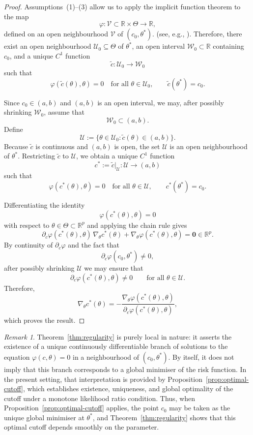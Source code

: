\documentclass[11pt,a4paper]{article}
\theoremstyle{definition}
\theoremstyle{remark}
\newtheorem{remark}[theorem]{Remark}
\newcommand{\1}{\mathbf{1}}
\begin{document}
\begin{proof}
Assumptions~(1)--(3) allow us to apply the implicit function theorem
to the map
\[
\varphi:\mathcal V\subset \mathbb R\times\Theta\to\mathbb R,
\]
defined on an open neighbourhood $\mathcal V$ of $(c_0,\theta^*)$.
(see, e.g., \citealt[Theorem~9.28]{rudin1976principles}).
Therefore, there exist an open neighbourhood
$\mathcal U_0\subseteq\Theta$ of $\theta^*$, an open interval
$\mathcal W_0\subset \mathbb R$ containing $c_0$, and a unique
$C^1$ function
\[
\tilde c:\mathcal U_0\to\mathcal W_0
\]
such that
\[
\varphi(\tilde c(\theta),\theta)=0
\quad\text{for all }\theta\in\mathcal U_0,
\qquad
\tilde c(\theta^*)=c_0.
\]

\noindent
Since $c_0\in(a,b)$ and $(a,b)$ is an open interval, we may,
after possibly shrinking $\mathcal W_0$, assume that
\[
\mathcal W_0\subset(a,b).
\]
Define
\[
\mathcal U
:=
\{\theta\in\mathcal U_0:\tilde c(\theta)\in(a,b)\}.
\]
Because $\tilde c$ is continuous and $(a,b)$ is open, the set
$\mathcal U$ is an open neighbourhood of $\theta^*$.
Restricting $\tilde c$ to $\mathcal U$, we obtain a unique
$C^1$ function
\[
c^*:=\tilde c|_{\mathcal U}:\mathcal U\to(a,b)
\]
such that
\[
\varphi(c^*(\theta),\theta)=0
\quad\text{for all }\theta\in\mathcal U,
\qquad
c^*(\theta^*)=c_0.
\]

\noindent
Differentiating the identity
\[
\varphi(c^*(\theta),\theta)=0
\]
with respect to $\theta\in\Theta\subset\mathbb R^p$ and applying the
chain rule gives
\[
\partial_c\varphi(c^*(\theta),\theta)\,
\nabla_\theta c^*(\theta)
+
\nabla_\theta\varphi(c^*(\theta),\theta)
=
\mathbf 0
\in\mathbb R^p.
\]
By continuity of $\partial_c\varphi$ and the fact that
\[
\partial_c\varphi(c_0,\theta^*)\neq 0,
\]
after possibly shrinking $\mathcal U$ we may ensure that
\[
\partial_c\varphi(c^*(\theta),\theta)\neq 0
\qquad\text{for all }\theta\in\mathcal U.
\]
Therefore,
\[
\nabla_\theta c^*(\theta)
=
-
\frac{\nabla_\theta\varphi(c^*(\theta),\theta)}
{\partial_c\varphi(c^*(\theta),\theta)},
\]
which proves the result.
\end{proof}
\begin{remark}
\normalfont
Theorem~\ref{thm:regularity} is purely local in nature: it
asserts the existence of a unique continuously differentiable
branch of solutions to the equation $\varphi(c,\theta)=0$ in a
neighbourhood of $(c_0,\theta^*)$. By itself, it does not imply
that this branch corresponds to a global minimiser of the risk
function. In the present setting, that interpretation is
provided by Proposition~\ref{prop:optimal-cutoff}, which
establishes existence, uniqueness, and global optimality of the
cutoff under a monotone likelihood ratio condition. Thus, when
Proposition~\ref{prop:optimal-cutoff} applies, the point $c_0$
may be taken as the unique global minimiser at $\theta^*$, and
Theorem~\ref{thm:regularity} shows that this optimal cutoff
depends smoothly on the parameter.
\end{remark}
\end{document}
